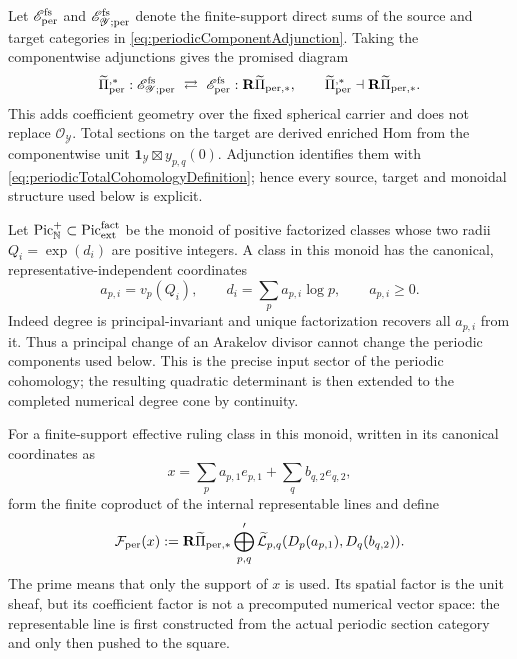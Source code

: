 \documentclass[11pt]{amsart}
\theoremstyle{definition}
\theoremstyle{remark}
\newcommand{\Pic}{\operatorname{Pic}}
\begin{document}
Let $\mathscr E_{\rm per}^{\rm fs}$ and
$\mathscr E_{\mathscr Y;\rm per}^{\rm fs}$ denote the finite-support direct
sums of the source and target categories in
\eqref{eq:periodicComponentAdjunction}.  Taking the componentwise adjunctions
gives the promised diagram
\begin{equation}\label{eq:periodicCoefficientProjection}
 \widetilde\Pi_{\rm per}^{,*}:
 \mathscr E_{\mathscr Y;\rm per}^{\rm fs}
 \ \rightleftarrows\
 \mathscr E_{\rm per}^{\rm fs}:
 \mathbf R\widetilde\Pi_{{\rm per},*},
 \qquad
 \widetilde\Pi_{\rm per}^{,*}\dashv
 \mathbf R\widetilde\Pi_{{\rm per},*}.
\end{equation}
This adds coefficient geometry over the fixed spherical carrier and does
not replace $\mathcal O_{\mathscr Y}$.  Total sections on the target are
derived enriched Hom from the componentwise unit
$\mathbf1_{\mathscr Y}\boxtimes y_{p,q}(0)$.  Adjunction identifies them
with \eqref{eq:periodicTotalCohomologyDefinition}; hence every source,
target and monoidal structure used below is explicit.

Let $\Pic_{\mathbb N}^{+}\subset\Pic_{\rm ext}^{\rm fact}$ be the monoid of
positive factorized classes whose two radii
$Q_i=\exp(d_i)$ are positive integers.  A class in this monoid has the
canonical, representative-independent coordinates
\begin{equation}\label{eq:canonicalPrimeCoordinates}
 a_{p,i}=v_p(Q_i),\qquad
 d_i=\sum_p a_{p,i}\log p,\qquad a_{p,i}\geq0.
\end{equation}
Indeed degree is principal-invariant and unique factorization recovers all
$a_{p,i}$ from it.  Thus a principal change of an Arakelov divisor cannot
change the periodic components used below.  This is the precise input
sector of the periodic cohomology; the resulting quadratic determinant is
then extended to the completed numerical degree cone by continuity.

For a finite-support effective ruling class in this monoid, written in its
canonical coordinates as
\[
 x=\sum_p a_{p,1}e_{p,1}+\sum_qb_{q,2}e_{q,2},
\]
form the finite coproduct of the internal representable lines and define
\begin{equation}\label{eq:intrinsicCoefficientObject}
 \mathcal F_{\rm per}(x)
 :=\mathbf R\widetilde\Pi_{{\rm per},*}
    \bigoplus_{p,q}'\widetilde{\mathcal L}_{p,q}
          (D_p(a_{p,1}),D_q(b_{q,2})).
\end{equation}
The prime means that only the support of $x$ is used.  Its spatial factor is
the unit sheaf, but its coefficient factor is not a precomputed numerical
vector space: the representable line is first constructed from the actual
periodic section category and only then pushed to the square.
\end{document}
